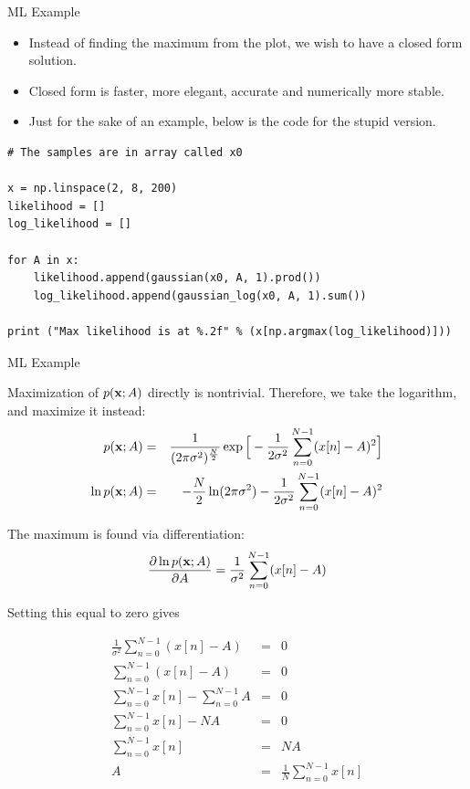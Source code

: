 \documentclass[10pt, aspectratio=169]{beamer} %
\newcommand{\x}{{\bf x}}
\begin{document}
\begin{frame}[fragile,allowframebreaks=0.8]
{ML Example}
\begin{itemize}
\item Instead of finding the maximum from the plot, 
we wish to have a closed form solution.
\item Closed form is faster, more elegant, accurate and numerically more stable.
\item Just for the sake of an example, below is the code for the stupid version.
\end{itemize}
\begin{center}
\begin{minipage}{9cm}
\begin{lstlisting}
# The samples are in array called x0

x = np.linspace(2, 8, 200)
likelihood = []
log_likelihood = []

for A in x:
    likelihood.append(gaussian(x0, A, 1).prod())
    log_likelihood.append(gaussian_log(x0, A, 1).sum())

print ("Max likelihood is at %.2f" % (x[np.argmax(log_likelihood)]))
\end{lstlisting}
\end{minipage}
\end{center}
\end{frame}

\begin{frame}[fragile,allowframebreaks=0.8]
{ML Example}
\begin{itemize}
{\small
\item Maximization of $p(\x;A)$ directly is nontrivial. Therefore,
  we take the logarithm, and maximize it instead:
\begin{eqnarray*}
p({\x};A) &=& \frac{1}{(2 \pi \sigma^2)^{\frac{N}{2}}} \exp\Big[-
  \frac{1}{2\sigma^2} \sum_{n=0}^{N-1} (x[n]-A)^2\Big]\\
\ln p(\x;A) &=& -\frac N2 \ln(2\pi\sigma^2)-
  \frac{1}{2\sigma^2} \sum_{n=0}^{N-1} (x[n]-A)^2
\end{eqnarray*}
\item The maximum is found via differentiation:
\[
\frac{\partial\ln p(\x;A) }{\partial A} = 
  \frac{1}{\sigma^2} \sum_{n=0}^{N-1} (x[n]-A)
\]
\item Setting this equal to zero gives
}
{\scriptsize
\begin{eqnarray*}
\frac{1}{\sigma^2} \sum_{n=0}^{N-1} (x[n]-A) &=& 0\\
\sum_{n=0}^{N-1} (x[n]-A) &=& 0\\
\sum_{n=0}^{N-1} x[n] - \sum_{n=0}^{N-1} A &=& 0\\
\sum_{n=0}^{N-1} x[n] - NA &=& 0\\
\sum_{n=0}^{N-1} x[n] &=& NA \\
A &=& \frac1N \sum_{n=0}^{N-1} x[n]
\end{eqnarray*}
}
\end{itemize}
\end{frame}
\end{document}
